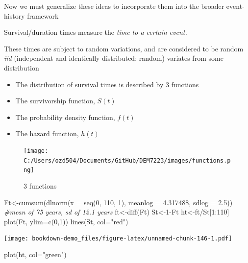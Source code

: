 \documentclass[
]{article}
\newenvironment{Shaded}{\begin{snugshade}}{\end{snugshade}}
\newcommand{\AttributeTok}[1]{\textcolor[rgb]{0.77,0.63,0.00}{#1}}
\newcommand{\CommentTok}[1]{\textcolor[rgb]{0.56,0.35,0.01}{\textit{#1}}}
\newcommand{\DecValTok}[1]{\textcolor[rgb]{0.00,0.00,0.81}{#1}}
\newcommand{\FloatTok}[1]{\textcolor[rgb]{0.00,0.00,0.81}{#1}}
\newcommand{\FunctionTok}[1]{\textcolor[rgb]{0.00,0.00,0.00}{#1}}
\newcommand{\NormalTok}[1]{#1}
\newcommand{\OtherTok}[1]{\textcolor[rgb]{0.56,0.35,0.01}{#1}}
\newcommand{\SpecialCharTok}[1]{\textcolor[rgb]{0.00,0.00,0.00}{#1}}
\newcommand{\StringTok}[1]{\textcolor[rgb]{0.31,0.60,0.02}{#1}}
\providecommand{\tightlist}{%
  \setlength{\itemsep}{0pt}\setlength{\parskip}{0pt}}
\begin{document}
Now we must generalize these ideas to incorporate them into the broader event-history framework

Survival/duration times measure the \emph{time to a certain event.}

These times are subject to random variations, and are considered to be random \emph{iid} (independent and identically distributed; random) variates from some distribution

\begin{itemize}
\tightlist
\item
  The distribution of survival times is described by 3 functions
\item
  The survivorship function, \(S(t)\)
\item
  The probability density function, \(f(t)\)
\item
  The hazard function, \(h(t)\)
\end{itemize}

\begin{figure}
\centering
\texttt{[image: C:/Users/ozd504/Documents/GitHub/DEM7223/images/functions.png]}
\caption{3 functions}
\end{figure}

\begin{Shaded}
\begin{Highlighting}[]
\NormalTok{Ft}\OtherTok{\textless{}{-}}\FunctionTok{cumsum}\NormalTok{(}\FunctionTok{dlnorm}\NormalTok{(}\AttributeTok{x =} \FunctionTok{seq}\NormalTok{(}\DecValTok{0}\NormalTok{, }\DecValTok{110}\NormalTok{, }\DecValTok{1}\NormalTok{), }\AttributeTok{meanlog =} \FloatTok{4.317488}\NormalTok{, }\AttributeTok{sdlog =} \FloatTok{2.5}\NormalTok{)) }\CommentTok{\#mean of 75 years, sd of 12.1 years}
\NormalTok{ft}\OtherTok{\textless{}{-}}\FunctionTok{diff}\NormalTok{(Ft)}
\NormalTok{St}\OtherTok{\textless{}{-}}\DecValTok{1}\SpecialCharTok{{-}}\NormalTok{Ft}
\NormalTok{ht}\OtherTok{\textless{}{-}}\NormalTok{ft}\SpecialCharTok{/}\NormalTok{St[}\DecValTok{1}\SpecialCharTok{:}\DecValTok{110}\NormalTok{]}
\FunctionTok{plot}\NormalTok{(Ft, }\AttributeTok{ylim=}\FunctionTok{c}\NormalTok{(}\DecValTok{0}\NormalTok{,}\DecValTok{1}\NormalTok{))}
\FunctionTok{lines}\NormalTok{(St, }\AttributeTok{col=}\StringTok{"red"}\NormalTok{)}
\end{Highlighting}
\end{Shaded}

\texttt{[image: bookdown-demo\_files/figure-latex/unnamed-chunk-146-1.pdf]}

\begin{Shaded}
\begin{Highlighting}[]
\FunctionTok{plot}\NormalTok{(ht, }\AttributeTok{col=}\StringTok{"green"}\NormalTok{)}
\end{Highlighting}
\end{Shaded}
\end{document}
